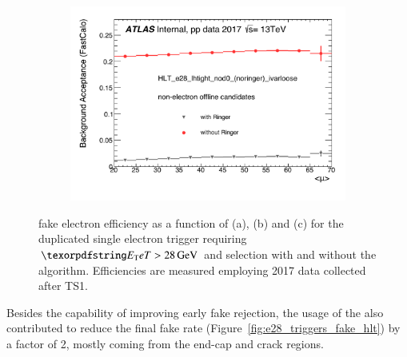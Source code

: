 \begin{figure}[h!tb]
\begin{center}
  \begin{subfigure}[c]{.48\textwidth}
  \centering
  \includegraphics[width=\textwidth]{sections/operation/figures/efficiencies/eff_EGAM7_e28_ringer_and_noringer_2017_after_ts1_L2Calo_mu.pdf}
  \caption{}
  \end{subfigure}
  \caption{\label{fig:e28_triggers_fake} \fastcalo %
  fake electron efficiency as a function of \et (a), \eta (b) and \avgmu (c) for the
  duplicated single electron trigger requiring $\et > \SI{28}{\GeV}$ and \tight
  selection with and without the \rnn{} algorithm. Efficiencies are measured
  employing 2017 data collected after TS1.}%
  
  \end{center}
\end{figure}



Besides the capability of improving early fake rejection, the usage of the
\rnn{} also contributed to reduce the final fake rate
(Figure~\ref{fig:e28_triggers_fake_hlt}) by a factor of 2, mostly coming from
the end-cap and crack regions. %

